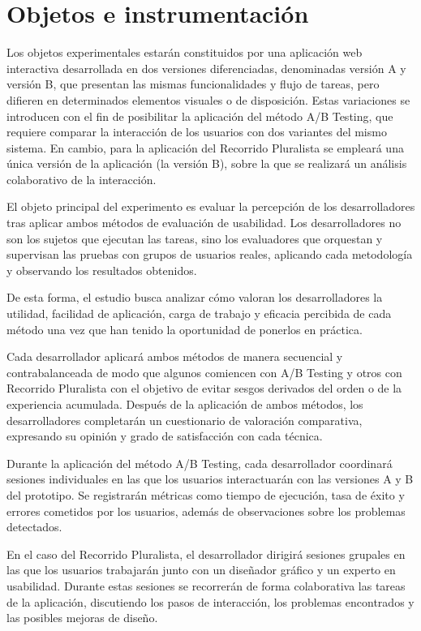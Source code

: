 \documentclass[a4paper,12pt]{report}
\begin{document}
\section{Objetos e instrumentación}

Los objetos experimentales estarán constituidos por una aplicación web interactiva desarrollada en dos versiones diferenciadas, 
denominadas versión A y versión B, que presentan las mismas funcionalidades y flujo de tareas, pero difieren en determinados elementos visuales o de disposición. 
Estas variaciones se introducen con el fin de posibilitar la aplicación del método A/B Testing, que requiere comparar la interacción de los usuarios con dos variantes del mismo sistema.
En cambio, para la aplicación del Recorrido Pluralista se empleará una única versión de la aplicación (la versión B), 
sobre la que se realizará un análisis colaborativo de la interacción.

El objeto principal del experimento es evaluar la percepción de los desarrolladores 
tras aplicar ambos métodos de evaluación de usabilidad. 
Los desarrolladores no son los sujetos que ejecutan las tareas, 
sino los evaluadores que orquestan y supervisan las pruebas con grupos de usuarios reales, 
aplicando cada metodología y observando los resultados obtenidos.

De esta forma, el estudio busca analizar cómo valoran los desarrolladores la utilidad, 
facilidad de aplicación, carga de trabajo y eficacia percibida de cada método una vez que han tenido la oportunidad de ponerlos en práctica.

Cada desarrollador aplicará ambos métodos de manera secuencial y contrabalanceada de modo que algunos comiencen con A/B Testing y otros con Recorrido Pluralista con el objetivo de evitar sesgos derivados del orden o de la experiencia acumulada.
Después de la aplicación de ambos métodos, los desarrolladores completarán un cuestionario de valoración comparativa, expresando su opinión y grado de satisfacción con cada técnica.

Durante la aplicación del método A/B Testing, cada desarrollador coordinará sesiones individuales en las que los usuarios interactuarán con las versiones A y B del prototipo. 
Se registrarán métricas como tiempo de ejecución, tasa de éxito y errores cometidos por los usuarios, además de observaciones sobre los problemas detectados.

En el caso del Recorrido Pluralista, el desarrollador dirigirá sesiones grupales en las que los usuarios trabajarán junto 
con un diseñador gráfico y un experto en usabilidad. 
Durante estas sesiones se recorrerán de forma colaborativa las tareas de la aplicación, discutiendo los pasos de interacción, 
los problemas encontrados y las posibles mejoras de diseño.
\end{document}
